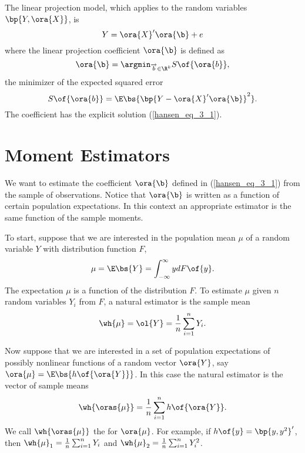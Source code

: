 The linear projection model, which applies to the random variables $\bp{Y, \ora{X}}$, is 
\begin{equation}
    \label{hansen_eq_3_2}
    Y = \ora{X}^\prime \ora{\b} + e
\end{equation}
where the linear projection coefficient $\ora{\b}$ is defined as 
\begin{equation}
    \label{hansen_eq_3_3}
    \ora{\b} = \argmin_{\overrightarrow{b} \in \R^k} S\of{\ora{b}},
\end{equation}
the minimizer of the expected squared error 
\begin{equation}
    \label{hansen_eq_3_4}
    S\of{\ora{b}} = \E\bs{\bp{Y - \ora{X}^\prime \ora{\b}}^2}.
\end{equation}
The coefficient has the explicit solution (\ref{hansen_eq_3_1}).

\section{Moment Estimators}

We want to estimate the coefficient $\ora{\b}$ defined in (\ref{hansen_eq_3_1}) from the sample of observations. Notice that $\ora{\b}$ is written as a function of certain population expectations. In this context an appropriate estimator is the same function of the sample moments. 

To start, suppose that we are interested in the population mean $\mu$ of a random variable $Y$ with distribution function $F$,
\begin{equation}
    \label{hansen_eq_3_5}
    \mu = \E\bs{Y} = \int_{-\infty}^{\infty} y dF\of{y}.
\end{equation}
The expectation $\mu$ is a function of the distribution $F$. To estimate $\mu$ given $n$ random variables $Y_i$ from $F$, a natural estimator is the sample mean
\begin{equation}
    \notag
    \wh{\mu} = \ol{Y} = \frac{1}{n} \sum_{i=1}^n Y_i.
\end{equation}

Now suppose that we are interested in a set of population expectations of possibly nonlinear functions of a random vector $\ora{Y}$, say $\ora{\mu} = \E\bs{h\of{\ora{Y}}}$. In this case the natural estimator is the vector of sample means
\begin{equation}
    \notag
    \wh{\oras{\mu}} = \frac{1}{n} \sum_{i=1}^n h\of{\ora{Y}}.
\end{equation}
We call $\wh{\oras{\mu}}$ the  for $\ora{\mu}$. For example, if $h\of{y} = \bp{y, y^2}^\prime$, then $\wh{\mu}_1 = \frac{1}{n} \sum_{i=1}^n Y_i$ and $\wh{\mu}_2 = \frac{1}{n} \sum_{i=1}^n Y_i^2$.

